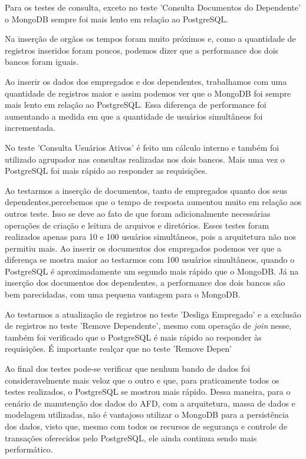 Para os testes de consulta, exceto no teste 'Consulta Documentos do Dependente' o MongoDB sempre foi mais lento em relação ao PostgreSQL.

Na inserção de orgãos os tempos foram muito próximos e, como a quantidade de registros inseridos foram poucos, podemos dizer que a performance dos dois bancos foram iguais.

Ao inserir os dados dos empregados e dos dependentes, trabalhamos com uma quantidade de registros maior e assim podemos ver que o MongoDB foi sempre mais lento em relação ao PostgreSQL. Essa diferença de performance foi aumentando a medida em que a quantidade de usuários simultâneos foi incrementada.

No teste 'Consulta Usuários Ativos' é feito um cálculo interno e também foi utilizado agrupador nas consultas realizadas nos dois bancos. Mais uma vez o PostgreSQL foi mais rápido ao responder as requisições.

Ao testarmos a inserção de documentos, tanto de empregados quanto dos seus dependentes,percebemos que o tempo de resposta aumentou muito em relação aos outros teste. Isso se deve ao fato de que foram adicionalmente necessárias operações de criação e leitura de arquivos e diretórios. Esses testes foram realizados apenas para 10 e 100 usuários simultâneos, pois a arquitetura não nos permitiu mais. Ao inserir os documentos dos empregados podemos ver que a diferença se mostra maior ao testarmos com 100 usuários simultâneos, quando o PostgreSQL é aproximadamente um segundo mais rápido que o MongoDB. Já na inserção dos documentos dos dependentes, a performance dos dois bancos são bem parecidadas, com uma pequena vantagem para o MongoDB.

Ao testarmos a atualização de registros no teste 'Desliga Empregado' e a exclusão de registros no teste 'Remove Dependente', mesmo com operação de \textit{join} nesse, também foi verificado que o PostgreSQL é mais rápido ao responder às requisições. É importante realçar que no teste 'Remove Depen'

Ao final dos testes pode-se verificar que nenhum bando de dados foi consideravelmente mais veloz que o outro e que, para praticamente todos os testes realizados, o PostgreSQL se mostrou mais rápido. Dessa maneira, para o cenário de manutenção dos dados do AFD, com a arquitetura, massa de dados e modelagem utilizadas, não é vantajoso utilizar o MongoDB para a persistência dos dados, visto que, mesmo com todos os recursos de segurança e controle de transações oferecidos pelo PostgreSQL, ele ainda continua sendo mais performático.


